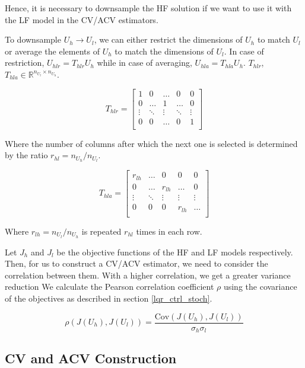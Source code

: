 \documentclass{article}
\begin{document}
Hence, it is necessary to downsample the HF solution if we want to use it with the LF model in the CV/ACV estimators.

To downsample $U_h \rightarrow U_l$, we can either restrict the dimensions of $U_h$ to match $U_l$ or average the elements of $U_h$ to match the dimensions of $U_l$.
In case of restriction, $U_{hlr} = T_{hlr} U_h$ while in case of averaging, $U_{hla} = T_{hla} U_h$.
$T_{hlr}$, $T_{hla} \in \mathbb{R}^{n_{U_l} \times n_{U_h}}$.

$$
T_{hlr} =
\begin{bmatrix}
  1 & 0 & \ldots & 0 & 0 \\
  0 & \ldots & 1 & \ldots & 0 \\
  \vdots & \ddots & \vdots & \ddots & \vdots \\
  0 & 0 & \ldots & 0 & 1 \\
\end{bmatrix}
$$

Where the number of columns after which the next one is selected is determined by the ratio $r_{hl} = n_{U_h} / n_{U_l}$.

$$
T_{hla} =
\begin{bmatrix}
  r_{lh} & \ldots & 0 & 0 & 0 \\
  0 & \ldots & r_{lh} & \ldots & 0 \\
  \vdots & \ddots & \vdots & \vdots & \vdots \\
  0 & 0 & 0 & r_{lh} & \ldots \\
\end{bmatrix}
$$

Where $r_{lh} = n_{U_l} / n_{U_h}$ is repeated $r_{hl}$ times in each row.

Let $J_h$ and $J_l$ be the objective functions of the HF and LF models respectively. Then, for us to construct a
CV/ACV estimator, we need to consider the correlation between them. With a higher correlation, we get a greater variance reduction
We calculate the Pearson correlation coefficient $\rho$ using the covariance of the objectives
as described in section \ref{lqr_ctrl_stoch}.

\begin{equation}
  \rho(J(U_h), J(U_l)) = \frac{\text{Cov}(J(U_h), J(U_l))}{\sigma_h \sigma_l}
\end{equation}

\subsection{CV and ACV Construction}
\end{document}
